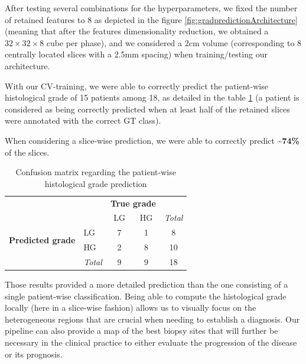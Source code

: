 After testing several combinations for the hyperparameters, we
fixed the number of retained features to 8 as depicted in the
figure \ref{fig:gradpredictionArchitecture} (meaning that after the features dimensionality reduction,
we obtained a $ 32\times32\times8 $ cube per phase), and we considered a 2cm volume
(corresponding to 8 centrally located slices with a 2.5mm spacing) when
training/testing our architecture.

With our CV-training, we were able to correctly predict the patient-wise
histological grade of 15 patients among 18, as detailed in the table \ref{tab:confusion_matrix} (a patient is considered as being correctly predicted
when at least half of the retained slices were annotated with the
correct GT class).

When considering a slice-wise prediction, we were able to correctly
predict \textbf{\textasciitilde{}74\%} of the slices.


\renewcommand{\arraystretch}{2}
\begin{table}[!htp]\centering
\caption{Confusion matrix regarding the patient-wise  histological grade prediction}\label{tab:confusion_matrix}
\begin{tabular}{l|l|c|c|c}
\multicolumn{2}{c}{}&\multicolumn{2}{c}{\textbf{True grade}}&\\
\cline{3-4}
\multicolumn{2}{c|}{}&LG&HG&\multicolumn{1}{c}{\textit{Total}}\\
\cline{2-4}
\multirow{2}{*}{\textbf{Predicted grade}}& LG & 7 & 1 & 8\\
\cline{2-4}
& HG & 2 & 8 & 10 \\
\cline{2-4}
\multicolumn{1}{c}{} & \multicolumn{1}{c}{\textit{Total}} & \multicolumn{1}{c}{9} & \multicolumn{    1}{c}{9} & \multicolumn{1}{c}{18}\\
\end{tabular}
\end{table}
\renewcommand{\arraystretch}{5}


Those results provided a more detailed prediction than the one
consisting of a single patient-wise classification. Being able to
compute the histological grade locally (here in a slice-wise fashion)
allows us to visually focus on the heterogeneous regions that are
crucial when needing to establish a diagnosis. Our pipeline can also
provide a map of the best biopsy sites that will further be necessary in
the clinical practice to either evaluate the progression of the disease
or its prognosis.

